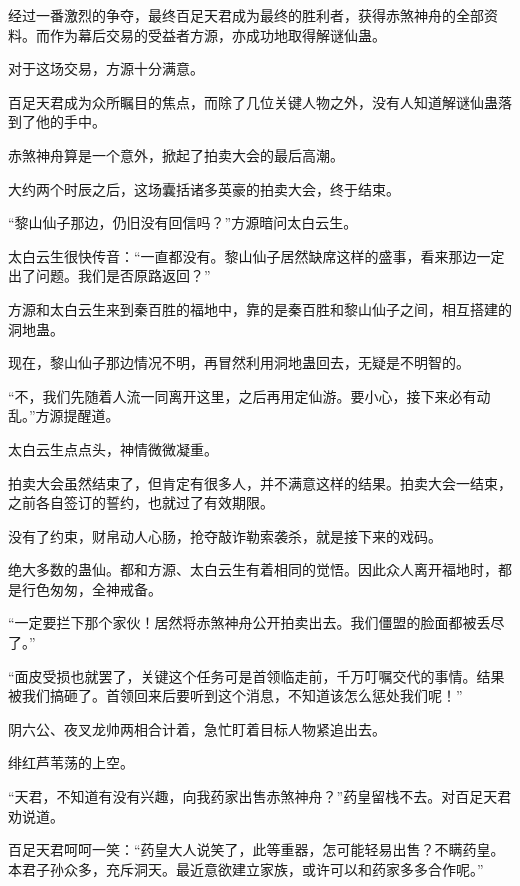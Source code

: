 
\begin{this_body}



经过一番激烈的争夺，最终百足天君成为最终的胜利者，获得赤煞神舟的全部资料。而作为幕后交易的受益者方源，亦成功地取得解谜仙蛊。

对于这场交易，方源十分满意。

百足天君成为众所瞩目的焦点，而除了几位关键人物之外，没有人知道解谜仙蛊落到了他的手中。

赤煞神舟算是一个意外，掀起了拍卖大会的最后高潮。

大约两个时辰之后，这场囊括诸多英豪的拍卖大会，终于结束。

“黎山仙子那边，仍旧没有回信吗？”方源暗问太白云生。

太白云生很快传音：“一直都没有。黎山仙子居然缺席这样的盛事，看来那边一定出了问题。我们是否原路返回？”

方源和太白云生来到秦百胜的福地中，靠的是秦百胜和黎山仙子之间，相互搭建的洞地蛊。

现在，黎山仙子那边情况不明，再冒然利用洞地蛊回去，无疑是不明智的。

“不，我们先随着人流一同离开这里，之后再用定仙游。要小心，接下来必有动乱。”方源提醒道。

太白云生点点头，神情微微凝重。

拍卖大会虽然结束了，但肯定有很多人，并不满意这样的结果。拍卖大会一结束，之前各自签订的誓约，也就过了有效期限。

没有了约束，财帛动人心肠，抢夺敲诈勒索袭杀，就是接下来的戏码。

绝大多数的蛊仙。都和方源、太白云生有着相同的觉悟。因此众人离开福地时，都是行色匆匆，全神戒备。

“一定要拦下那个家伙！居然将赤煞神舟公开拍卖出去。我们僵盟的脸面都被丢尽了。”

“面皮受损也就罢了，关键这个任务可是首领临走前，千万叮嘱交代的事情。结果被我们搞砸了。首领回来后要听到这个消息，不知道该怎么惩处我们呢！”

阴六公、夜叉龙帅两相合计着，急忙盯着目标人物紧追出去。

绯红芦苇荡的上空。

“天君，不知道有没有兴趣，向我药家出售赤煞神舟？”药皇留栈不去。对百足天君劝说道。

百足天君呵呵一笑：“药皇大人说笑了，此等重器，怎可能轻易出售？不瞒药皇。本君子孙众多，充斥洞天。最近意欲建立家族，或许可以和药家多多合作呢。”


\end{this_body}
